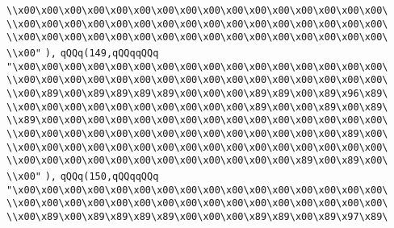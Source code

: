 \verb|\\x00\x00\x00\x00\x00\x00\x00\x00\x00\x00\x00\x00\x00\x00\x00\x00\|\newline
\verb|\\x00\x00\x00\x00\x00\x00\x00\x00\x00\x00\x00\x00\x00\x00\x00\x00\|\newline
\verb|\\x00\x00\x00\x00\x00\x00\x00\x00\x00\x00\x00\x00\x00\x00\x00\x00\|\newline
\verb|\\x00"|\newline
\verb|),|\newline
\verb|qQQq(149,qQQqqQQq|\newline
\verb|"\x00\x00\x00\x00\x00\x00\x00\x00\x00\x00\x00\x00\x00\x00\x00\x00\|\newline
\verb|\\x00\x00\x00\x00\x00\x00\x00\x00\x00\x00\x00\x00\x00\x00\x00\x00\|\newline
\verb|\\x00\x89\x00\x89\x89\x89\x89\x00\x00\x00\x89\x89\x00\x89\x96\x89\|\newline
\verb|\\x00\x00\x00\x00\x00\x00\x00\x00\x00\x00\x89\x00\x00\x89\x00\x89\|\newline
\verb|\\x89\x00\x00\x00\x00\x00\x00\x00\x00\x00\x00\x00\x00\x00\x00\x00\|\newline
\verb|\\x00\x00\x00\x00\x00\x00\x00\x00\x00\x00\x00\x00\x00\x00\x89\x00\|\newline
\verb|\\x00\x00\x00\x00\x00\x00\x00\x00\x00\x00\x00\x00\x00\x00\x00\x00\|\newline
\verb|\\x00\x00\x00\x00\x00\x00\x00\x00\x00\x00\x00\x00\x89\x00\x89\x00\|\newline
\verb|\\x00"|\newline
\verb|),|\newline
\verb|qQQq(150,qQQqqQQq|\newline
\verb|"\x00\x00\x00\x00\x00\x00\x00\x00\x00\x00\x00\x00\x00\x00\x00\x00\|\newline
\verb|\\x00\x00\x00\x00\x00\x00\x00\x00\x00\x00\x00\x00\x00\x00\x00\x00\|\newline
\verb|\\x00\x89\x00\x89\x89\x89\x89\x00\x00\x00\x89\x89\x00\x89\x97\x89\|\newline
